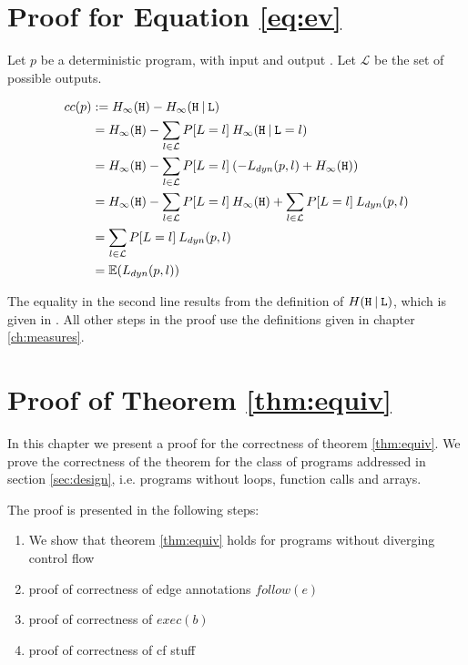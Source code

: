 \chapter{Proof for Equation \ref{eq:ev}}\label{ch:evProof}

Let $p$ be a deterministic program, with input \In and output \Out. Let $\mathcal{L}$ be the set of possible outputs.

\begin{align*}
    cc(p) &:= H_\infty(\mathtt{H}) - H_\infty(\mathtt{H} \: | \: \mathtt{L}) \\
    &= H_\infty(\mathtt{H}) - \sum\limits_{l \in \mathcal{L}} P[L = l]\: H_\infty(\mathtt{H} \: | \: \mathtt{L} = l) \\
    &= H_\infty(\mathtt{H}) - \sum\limits_{l \in \mathcal{L}} P[L = l]\: (-L_{dyn}(p, l) + H_\infty(\mathtt{H})) \\
    &= H_\infty(\mathtt{H}) - \sum\limits_{l \in \mathcal{L}} P[L = l]\: H_\infty(\mathtt{H}) + \sum\limits_{l \in \mathcal{L}} P[L = l]\: L_{dyn}(p, l) \\
    &= \sum\limits_{l \in \mathcal{L}} P[L = l] \: L_{dyn}(p, l) \\
    &= \mathbb{E}(L_{dyn}(p,l))
\end{align*}

The equality in the second line results from the definition of $H( \mathtt{H} \: |\: \mathtt{L})$, which is given in \cite{smith09}. All other steps in the proof use the definitions given in chapter \ref{ch:measures}.

\chapter{Proof of Theorem \ref{thm:equiv}}\label{ch:proofEquiv}


In this chapter we present a proof for the correctness of theorem \ref{thm:equiv}. We prove the correctness of the theorem for the class of programs addressed in section \ref{sec:design}, i.e. programs without loops, function calls and arrays.

The proof is presented in the following steps:
\begin{enumerate}
    \setlength\itemsep{0em}
    \item We show that theorem \ref{thm:equiv} holds for programs without diverging control flow
    \item proof of correctness of edge annotations $follow(e)$
    \item proof of correctness of $exec(b)$
    \item proof of correctness of cf stuff
\end{enumerate}

